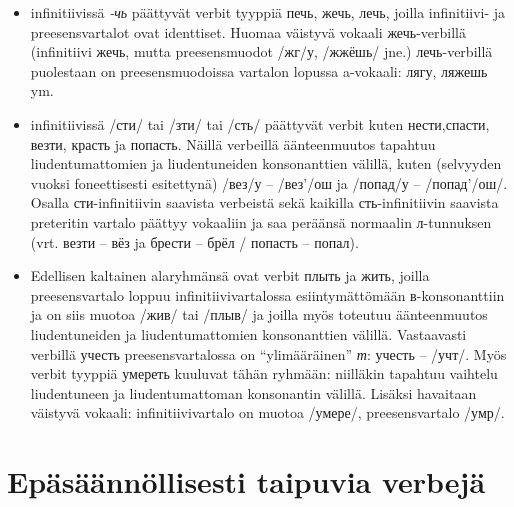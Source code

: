 \documentclass[]{scrreprt}
\providecommand{\tightlist}{%
  \setlength{\itemsep}{0pt}\setlength{\parskip}{0pt}}
\begin{document}
\begin{itemize}
\tightlist
\item
  infinitiivissä \emph{-чь} päättyvät verbit tyyppiä печь, жечь, лечь,
  joilla infinitiivi- ja preesensvartalot ovat identtiset. Huomaa
  väistyvä vokaali жечь-verbillä (infinitiivi жечь, mutta preesensmuodot
  /жг/у, /жжёшь/ jne.) лечь-verbillä puolestaan on preesensmuodoissa
  vartalon lopussa a-vokaali: лягу, ляжешь ym.
\item
  infinitiivissä /сти/ tai /зти/ tai /сть/ päättyvät verbit kuten
  нести,спасти, везти, красть ja попасть. Näillä verbeillä äänteenmuutos
  tapahtuu liudentumattomien ja liudentuneiden konsonanttien välillä,
  kuten (selvyyden vuoksi foneettisesti esitettynä) /вез/у -- /вез'/ош
  ja /попад/у -- /попад'/ош/. Osalla сти-infinitiivin saavista verbeistä
  sekä kaikilla сть-infinitiivin saavista preteritin vartalo päättyy
  vokaaliin ja saa peräänsä normaalin л-tunnuksen (vrt. везти -- вёз ja
  брести -- брёл / попасть -- попал).
\item
  Edellisen kaltainen alaryhmänsä ovat verbit плыть ja жить, joilla
  preesensvartalo loppuu infinitiivivartalossa esiintymättömään
  в-konsonanttiin ja on siis muotoa /жив/ tai /плыв/ ja joilla myös
  toteutuu äänteenmuutos liudentuneiden ja liudentumattomien
  konsonanttien välillä. Vastaavasti verbillä учесть preesensvartalossa
  on ``ylimääräinen'' \emph{т}: учесть -- /учт/. Myös verbit tyyppiä
  умереть kuuluvat tähän ryhmään: niilläkin tapahtuu vaihtelu
  liudentuneen ja liudentumattoman konsonantin välillä. Lisäksi
  havaitaan väistyvä vokaali: infinitiivivartalo on muotoa /умере/,
  preesensvartalo /умр/.
\end{itemize}

\section{Epäsäännöllisesti taipuvia
verbejä}\label{epuxe4suxe4uxe4nnuxf6llisesti-taipuvia-verbejuxe4}
\end{document}
